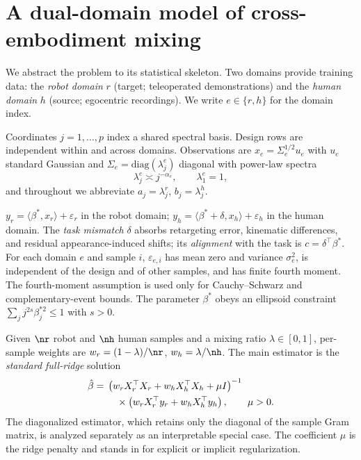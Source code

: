\section{A dual-domain model of cross-embodiment mixing}
\label{sec:setup}

We abstract the problem to its statistical skeleton.
Two domains provide training data: the \emph{robot domain} $r$ (target; teleoperated demonstrations) and the \emph{human domain} $h$ (source; egocentric recordings).
We write $e \in \{r,h\}$ for the domain index.

\begin{assumption}\label{ass:a1}
Coordinates $j = 1,\dots,p$ index a shared spectral basis. Design rows are independent within and across domains.
Observations are $x_e = \Sigma_e^{1/2} u_e$ with $u_e$ standard Gaussian and $\Sigma_e = \mathrm{diag}(\lambda^e_j)$ diagonal with power-law spectra
\begin{equation}
  \lambda^e_j \asymp j^{-\alpha_e}, \qquad \lambda^e_1 = 1,
  \label{eq:powerlaw}
\end{equation}
and throughout we abbreviate $a_j = \lambda^r_j$, $b_j = \lambda^h_j$.
\end{assumption}

\begin{assumption}\label{ass:a2}
$y_r = \langle \beta^*, x_r \rangle + \varepsilon_r$ in the robot domain; $y_h = \langle \beta^* + \delta, x_h \rangle + \varepsilon_h$ in the human domain.
The \emph{task mismatch} $\delta$ absorbs retargeting error, kinematic differences, and residual appearance-induced shifts; its \emph{alignment} with the task is $c = \delta^\top\beta^*$.
For each domain $e$ and sample $i$, $\varepsilon_{e,i}$ has mean zero and variance $\sigma_e^2$, is independent of the design and of other samples, and has finite fourth moment. The fourth-moment assumption is used only for Cauchy--Schwarz and complementary-event bounds. The parameter $\beta^*$ obeys an ellipsoid constraint $\sum_j j^{2s}\beta_j^{*2} \le 1$ with $s > 0$.
\end{assumption}

\begin{assumption}\label{ass:a3}
Given $\nr$ robot and $\nh$ human samples and a mixing ratio $\lambda \in [0,1]$, per-sample weights are $w_r = (1-\lambda)/\nr$, $w_h = \lambda/\nh$. The main estimator is the \emph{standard full-ridge} solution
\begin{align}
  \hat\beta ={}&
  \left(w_r X_r^\top X_r + w_h X_h^\top X_h + \mu I\right)^{-1}\notag\\
  &\quad\times
  \left(w_r X_r^\top y_r + w_h X_h^\top y_h\right),
  \qquad \mu>0.
  \label{eq:estimator}
\end{align}
The diagonalized estimator, which retains only the diagonal of the sample Gram matrix, is analyzed separately as an interpretable special case. The coefficient $\mu$ is the ridge penalty and stands in for explicit or implicit regularization.
\end{assumption}

